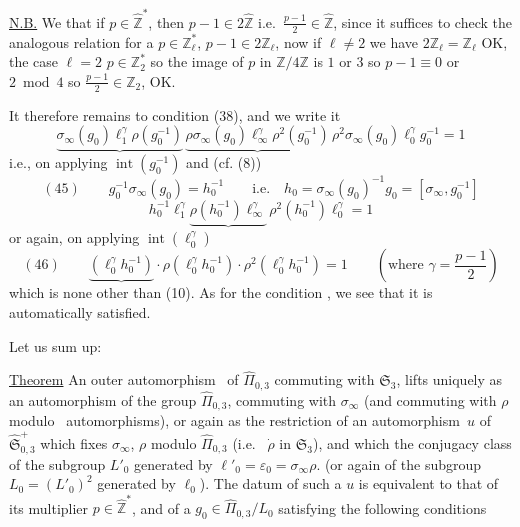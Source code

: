 \quad
\uline{N.B.} We  that if $p\in\widehat{\mathbb Z}^{*}$, then
$p-1\in 2\widehat{\mathbb Z}$ i.e.\ $\frac{p-1}{2}\in\widehat{\mathbb Z}$,
since it suffices to check the analogous relation for a $p\in\mathbb Z_\ell^{*}$,
 $p-1\in 2\mathbb Z_\ell$, now if $\ell\ne2$ we have
$2\mathbb Z_\ell=\mathbb Z_\ell$ OK,  the case $\ell=2$
$p\in\mathbb Z_2^{*}$ so the image of $p$ in $\mathbb Z/4\mathbb Z$
is $1$ or $3$ so $p-1\equiv0$ or $2\bmod4$
 so $\frac{p-1}{2}\in\mathbb Z_2$, OK.

\par
It therefore remains to  condition (38), and we write it
\[
\underbrace{\sigma_\infty(g_0)\ell_1^\gamma\rho(g_0^{-1})}\,
\underbrace{\rho\sigma_\infty(g_0)\ell_\infty^\gamma\rho^2(g_0^{-1})}\,
\rho^2\sigma_\infty(g_0)\ell_0^\gamma g_0^{-1}=1
\]
i.e., on applying $\operatorname{int}(g_0^{-1})$ and
(cf. (8))
\[
(45)\qquad g_0^{-1}\sigma_\infty(g_0)=h_0^{-1}
\qquad\text{i.e.}\quad
h_0=\sigma_\infty(g_0)^{-1}g_0=[\sigma_\infty,g_0^{-1}]
\]
\[
h_0^{-1}\ell_1^\gamma\underbrace{\rho(h_0^{-1})\ell_\infty^\gamma}\,
\rho^2(h_0^{-1})\ell_0^\gamma=1
\]
or again, on applying $\operatorname{int}(\ell_0^\gamma)$
\[
(46)\qquad
\boxed{\underbrace{(\ell_0^\gamma h_0^{-1})}\cdot
\rho(\ell_0^\gamma h_0^{-1})\cdot\rho^2(\ell_0^\gamma h_0^{-1})=1}
\qquad\left(\text{where }\gamma=\frac{p-1}{2}\right)
\]
which is none other than (10). As for the condition ,
we see that it is  automatically satisfied.


Let us sum up:

\uline{Theorem} An outer automorphism\  of
$\widehat{\Pi}_{0,3}$ commuting with
$\mathfrak S_3$, lifts uniquely as an automorphism
of the group  $\widehat{\Pi}_{0,3}$, commuting with
$\sigma_\infty$ (and commuting with $\rho$ modulo\  automorphisms),
or again as the restriction of an automorphism\ $u$ of
$\widehat{\mathfrak S}_{0,3}^{+}$
which fixes $\sigma_\infty$,  $\rho$ modulo $\widehat{\Pi}_{0,3}$
(i.e.\  $\dot\rho$ in $\mathfrak S_3$),
and which  the conjugacy class of the
 subgroup $L'_0$
 generated by $\ell'_0=\varepsilon_0=\sigma_\infty\rho$.
(or again of the  subgroup $L_0=(L'_0)^2$ generated by $\ell_0$).
The datum of such a $u$ is equivalent to that of its multiplier
$p\in\widehat{\mathbb Z}^{*}$, and of a $g_0\in\widehat{\Pi}_{0,3}/L_0$
satisfying the following conditions

